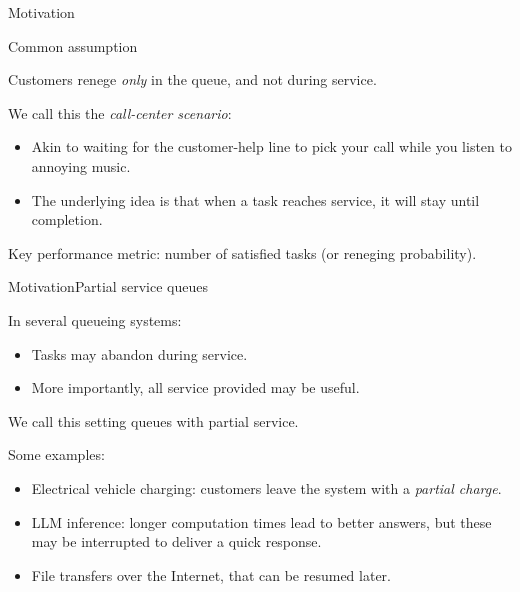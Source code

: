 \documentclass[aspectratio=169]{beamer}
\begin{document}
\begin{frame}{Motivation}
	
	\begin{block}{Common assumption}
		\begin{center}
		Customers renege \emph{only} in the queue, and not during service.
		\end{center}
	\end{block}
	\vfill
	\pause

	We call this the \emph{call-center scenario}:

	\begin{itemize}
		\item Akin to waiting for the customer-help line to pick your call while you listen to annoying music.
		
		\item The underlying idea is that when a task reaches service, it will stay until completion.
		
	\end{itemize}
	
	\vfill

	\alert{Key performance metric:} number of satisfied tasks (or reneging probability).

\end{frame}

\begin{frame}{Motivation}{Partial service queues}

	In several queueing systems:

	\begin{itemize}
		\item Tasks may abandon during service.
		\item More importantly, \alert{all service provided may be useful}.
	\end{itemize}

	\vfill

	We call this setting \alert{queues with partial service}.

	\pause

	\vfill

	Some examples:
	\begin{itemize}
		\item Electrical vehicle charging: customers leave the system with a \emph{partial charge}.
		\item LLM inference: longer computation times lead to better answers, but these may be interrupted to deliver a quick response.
		\item File transfers over the Internet, that can be resumed later.
	\end{itemize}

\end{frame}
\end{document}
